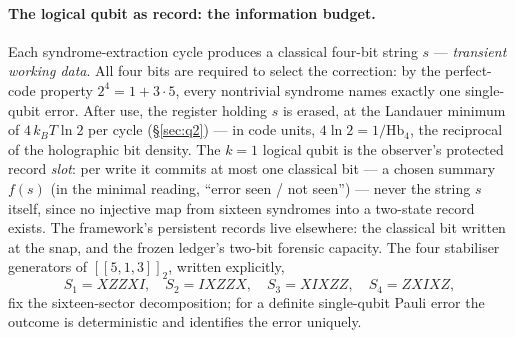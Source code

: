 \documentclass[11pt,a4paper]{article}
\newcommand{\Cq}[4]{[\![#1,#2,#3]\!]_{#4}}
\providecommand{\Hbfour}{\mathrm{Hb}_4}
\begin{document}
\paragraph{The logical qubit as record: the information budget.}
Each syndrome-extraction cycle produces a classical four-bit string $s$ --- \emph{transient working data}. All four bits are required to select the correction: by the perfect-code property $2^4 = 1 + 3\cdot5$, every nontrivial syndrome names exactly one single-qubit error. After use, the register holding $s$ is erased, at the Landauer minimum of $4\,k_BT\ln2$ per cycle (\S\ref{sec:q2}) --- in code units, $4\ln2 = 1/\Hbfour$, the reciprocal of the holographic bit density. The $k=1$ logical qubit is the observer's protected record \emph{slot}: per write it commits at most one classical bit --- a chosen summary $f(s)$ (in the minimal reading, ``error seen / not seen'') --- never the string $s$ itself, since no injective map from sixteen syndromes into a two-state record exists. The framework's persistent records live elsewhere: the classical bit written at the snap, and the frozen ledger's two-bit forensic capacity. The four stabiliser generators of $\Cq{5}{1}{3}{2}$, written explicitly,
\begin{equation}
  S_1 = XZZXI,\quad S_2 = IXZZX,\quad
  S_3 = XIXZZ,\quad S_4 = ZXIXZ,
  \label{eq:stabs}
\end{equation}
fix the sixteen-sector decomposition; for a definite single-qubit Pauli error the outcome is deterministic and identifies the error uniquely.
\end{document}
